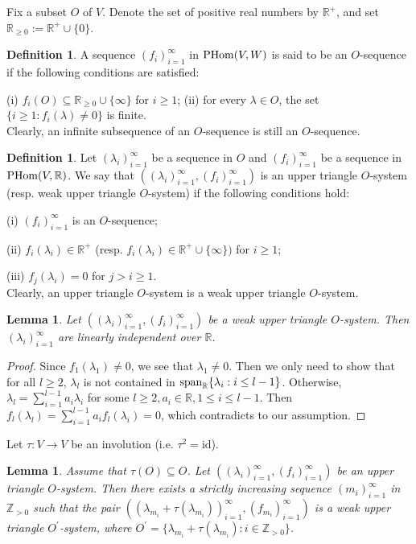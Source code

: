 \documentclass[12pt]{amsart}
\theoremstyle{plain}
\newtheorem{Lem}[Thm]{Lemma}
\theoremstyle{remark}
\theoremstyle{definition}
\newtheorem{Def}[Thm]{Definition}
\def\Z{\mathbb Z}
\def\R{\mathbb R}
\begin{document}
Fix a subset $O$ of $V$.
Denote the set of positive real numbers by $\R^+$, and set $\R_{\geq0}:=\R^+\cup\{0\}$.
\begin{Def}
	A sequence $(f_{i})_{i=1}^\infty$ in ${\rm PHom}(V, W)$ is said to be an $O$-sequence if the following conditions are satisfied:\par
	(i) $f_{i}(O) \subseteq \R_{\geq 0} \cup\{\infty\}$ for $i \geq 1$;
	(ii) for every $\lambda \in O$, the set $\{i\geq1:f_{i}(\lambda) \neq 0\}$ is finite.\\
	Clearly, an infinite subsequence of an $O$-sequence is still an $O$-sequence.
\end{Def}
\begin{Def}
	Let $(\lambda_{i})_{i=1}^\infty$ be a sequence in $O$ and $(f_{i})_{i=1}^\infty$ be a sequence in ${\rm PHom}(V,\R)$. We say that $((\lambda_{i})_{i=1}^\infty,(f_{i})_{i=1}^\infty) $ is an upper triangle $O$-system (resp. weak upper triangle $O$-system) if the following conditions hold:\par
	(i) $(f_{i})_{i=1}^\infty$ is an $O$-sequence;\par
	(ii) $f_{i}(\lambda_{i}) \in \R^{+}$ (resp. $f_{i}(\lambda_{i}) \in \R^{+} \cup\{\infty\})$ for $i\geq1$;\par
	(iii) $f_{j}(\lambda_{i})=0$ for $j>i\geq1$.\\
	Clearly, an upper triangle $O$-system is a weak upper triangle $O$-system.
\end{Def}
\begin{Lem}\label{weakindep}
	Let $((\lambda_{i})_{i=1}^\infty,(f_{i})_{i=1}^\infty)$ be a weak upper triangle $O$-system. Then $(\lambda_{i})_{i=1}^\infty$ are linearly independent over $\R$.
\end{Lem}
\begin{proof}
	Since $f_1(\lambda_1)\neq0$, we see that $\lambda_1\neq0$. Then we only need to show that for all $l \geq 2$, $\lambda_{l}$ is not contained in ${\rm span}_{\R}\{\lambda_{i}:i\leq l-1\}$. Otherwise, $\lambda_{l}=\sum_{i=1}^{l-1} a_{i} \lambda_{i}$ for some $l\geq2,a_{i}\in\R, 1\leq i\leq l-1$. Then $f_{l}(\lambda_{l})=\sum_{i=1}^{l-1} a_{i} f_{l}(\lambda_{i})=0$, which contradicts to our assumption.
\end{proof}
Let $\tau: V \to V$ be an involution (i.e. $\tau^2=\mathrm{id}$).
\begin{Lem}\label{invoweak} Assume that $\tau(O)\subseteq O$. Let $((\lambda_{i})_{i=1}^\infty,(f_{i})_{i=1}^\infty)$ be an upper triangle $O$-system. Then there exists a strictly increasing sequence $(m_{i})_{i=1}^\infty$ in $\Z_{>0}$ such that the pair $((\lambda_{m_{i}}+\tau(\lambda_{m_{i}}))_{i=1}^\infty,(f_{m_{i}})_{i=1}^\infty)$ is a weak upper triangle $O^\prime$-system, where $O^\prime=\{\lambda_{m_{i}}+\tau(\lambda_{m_{i}}):i\in\Z_{>0}\}$.
\end{Lem}
\end{document}
